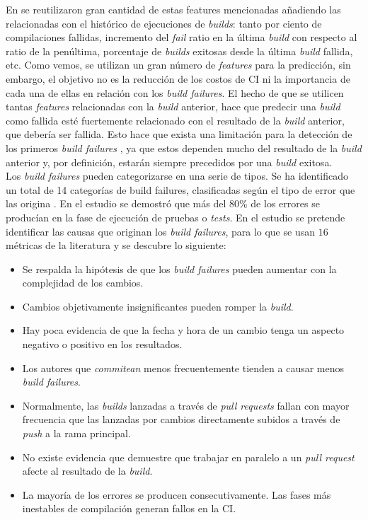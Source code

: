 En \cite{6} se reutilizaron gran cantidad de estas features mencionadas añadiendo las
relacionadas con el histórico de ejecuciones de \textit{builds}: tanto por ciento de compilaciones
fallidas, incremento del \textit{fail} ratio en la última \textit{build} con respecto al ratio
de la penúltima, porcentaje de \textit{builds} exitosas desde la última \textit{build} fallida,
etc. Como vemos, se utilizan un gran número de \textit{features} para la predicción, sin embargo,
el objetivo no es la reducción de los costos de CI ni la  importancia de cada una de
ellas en relación con los \textit{build failures}. El hecho de que se utilicen tantas
\textit{features} relacionadas con la \textit{build} anterior, hace que predecir una
\textit{build} como fallida esté fuertemente relacionado con el resultado de la \textit{build}
anterior, que debería ser fallida. Esto hace que exista una limitación para la detección de los
primeros \textit{build failures} \cite{2}, ya que estos dependen mucho del resultado de la
\textit{build} anterior y, por definición, estarán siempre precedidos por una \textit{build}
exitosa.\\

Los \textit{build failures} pueden categorizarse en una serie de tipos. Se ha identificado un
total de 14 categorías de build failures, clasificadas según el tipo de error que las origina
\cite{13}. En el estudio se demostró que más
del 80\% de los errores se producían en la fase de ejecución de pruebas o \textit{tests}. En
el estudio se pretende identificar las causas que originan los \textit{build failures}, para lo
que se usan $16$ métricas de la literatura y se descubre lo siguiente:

\begin{itemize}
      \item Se respalda la hipótesis de que los \textit{build failures} pueden aumentar con la 
      complejidad de los cambios.
      \item Cambios objetivamente insignificantes pueden romper la \textit{build}.
      \item Hay poca evidencia de que la fecha y hora de un cambio tenga un aspecto negativo o
      positivo en los resultados.
      \item Los autores que \textit{commitean} menos frecuentemente tienden a causar menos
      \textit{build failures}.
      \item Normalmente, las \textit{builds} lanzadas a través de \textit{pull requests} fallan
      con mayor frecuencia que las lanzadas por cambios directamente subidos a través de
      \textit{push} a la rama principal.
      \item No existe evidencia que demuestre que trabajar en paralelo a un \textit{pull request}
      afecte al resultado de la \textit{build}.
      \item La mayoría de los errores se producen consecutivamente. Las fases más inestables de
      compilación generan fallos en la CI.
\end{itemize}

